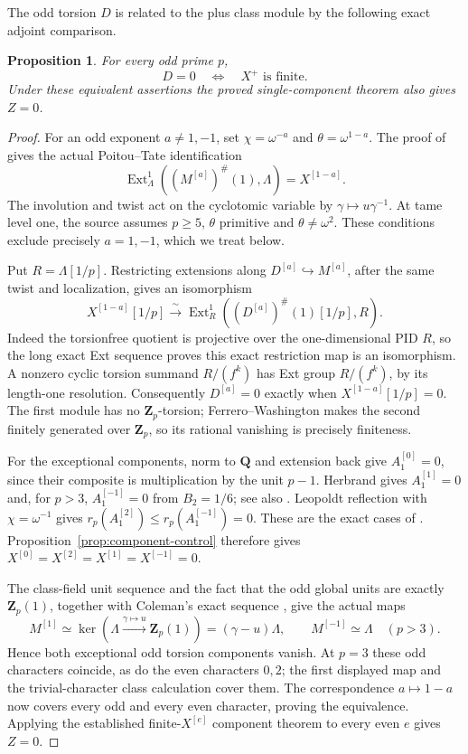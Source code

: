 \documentclass[11pt]{article}
\newtheorem{proposition}[theorem]{Proposition}
\theoremstyle{definition}\newtheorem{definition}[theorem]{Definition}
\begin{document}
The odd torsion $D$ is related to the plus class module
by the following exact adjoint comparison.

\begin{proposition}\label{prop:D-plus-finiteness}
For every odd prime $p$,
\[
                             D=0\quad\Longleftrightarrow\quad X^+\text{ is finite}.
\]
Under these equivalent assertions the proved
single-component theorem also gives $Z=0$.
\end{proposition}

\begin{proof}
For an odd exponent $a\ne1,-1$, set
$\chi=\omega^{-a}$ and $\theta=\omega^{1-a}$.
The proof of \cite[Proposition~2.2.6, p.~4]{WWEOrd}
gives the actual Poitou--Tate identification
\[
 \operatorname{Ext}^1_\Lambda
       ((M^{[a]})^\#(1),\Lambda)=X^{[1-a]}.
\]
The involution and twist act on the cyclotomic
variable by $\gamma\mapsto u\gamma^{-1}$.
At tame level one, the source assumes $p\geq5$,
$\theta$ primitive and $\theta\ne\omega^2$. These
conditions exclude precisely $a=1,-1$, which we treat below.

Put $R=\Lambda[1/p]$. Restricting extensions along
$D^{[a]}\hookrightarrow M^{[a]}$, after the same
twist and localization, gives an isomorphism
\[
 X^{[1-a]}[1/p]\xrightarrow{\ \sim\ }
 \operatorname{Ext}^1_R
       ((D^{[a]})^\#(1)[1/p],R).
\]
Indeed the torsionfree quotient is projective over
the one-dimensional PID $R$, so the long exact
Ext sequence proves this exact restriction map is
an isomorphism. A nonzero cyclic torsion summand
$R/(f^k)$ has Ext group $R/(f^k)$, by its length-one
resolution. Consequently $D^{[a]}=0$ exactly when
$X^{[1-a]}[1/p]=0$. The first module has no
$\mathbf Z_p$-torsion; Ferrero--Washington makes
the second finitely generated over $\mathbf Z_p$,
so its rational vanishing is precisely finiteness.

For the exceptional components, norm to $\mathbf Q$
and extension back give $A_1^{[0]}=0$, since their
composite is multiplication by the unit $p-1$.
Herbrand gives $A_1^{[1]}=0$ and, for $p>3$,
$A_1^{[-1]}=0$ from $B_2=1/6$; see also
\cite[Lemma~5.2.7, p.~13]{WWEOrd}.
Leopoldt reflection with $\chi=\omega^{-1}$ gives
$r_p(A_1^{[2]})\leq r_p(A_1^{[-1]})=0$.
These are the exact cases of
\cite[Theorems~4.4.2 and~4.5.7]{SharifiIwa}.
Proposition~\ref{prop:component-control} therefore
gives $X^{[0]}=X^{[2]}=X^{[1]}=X^{[-1]}=0$.

The class-field unit sequence and the fact that the
odd global units are exactly $\mathbf Z_p(1)$,
together with Coleman's exact sequence
\cite[Theorem~5.5.31, p.~148]{SharifiIwa}, give the
actual maps
\[
 M^{[1]}\simeq\ker(\Lambda\xrightarrow{\gamma\mapsto u}
                \mathbf Z_p(1))=(\gamma-u)\Lambda,
 \qquad M^{[-1]}\simeq\Lambda\quad(p>3).
\]
Hence both exceptional odd torsion components vanish.
At $p=3$ these odd characters coincide, as do the
even characters $0,2$; the first displayed map and
the trivial-character class calculation cover them.
The correspondence $a\mapsto1-a$ now covers every
odd and every even character, proving the equivalence.
Applying the established finite-$X^{[e]}$ component
theorem to every even $e$ gives $Z=0$.
\end{proof}
\end{document}
